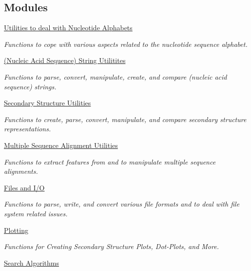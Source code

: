 \subsection*{Modules}
\begin{DoxyCompactItemize}
\item 
\hyperlink{group__alphabet__utils}{Utilities to deal with Nucleotide Alphabets}
\begin{DoxyCompactList}\small\item\em Functions to cope with various aspects related to the nucleotide sequence alphabet. \end{DoxyCompactList}\item 
\hyperlink{group__string__utils}{(\+Nucleic Acid Sequence) String Utilitites}
\begin{DoxyCompactList}\small\item\em Functions to parse, convert, manipulate, create, and compare (nucleic acid sequence) strings. \end{DoxyCompactList}\item 
\hyperlink{group__struct__utils}{Secondary Structure Utilities}
\begin{DoxyCompactList}\small\item\em Functions to create, parse, convert, manipulate, and compare secondary structure representations. \end{DoxyCompactList}\item 
\hyperlink{group__aln__utils}{Multiple Sequence Alignment Utilities}
\begin{DoxyCompactList}\small\item\em Functions to extract features from and to manipulate multiple sequence alignments. \end{DoxyCompactList}\item 
\hyperlink{group__file__utils}{Files and I/O}
\begin{DoxyCompactList}\small\item\em Functions to parse, write, and convert various file formats and to deal with file system related issues. \end{DoxyCompactList}\item 
\hyperlink{group__plotting__utils}{Plotting}
\begin{DoxyCompactList}\small\item\em Functions for Creating Secondary Structure Plots, Dot-\/\+Plots, and More. \end{DoxyCompactList}\item 
\hyperlink{group__search__utils}{Search Algorithms}

\end{DoxyCompactItemize}
